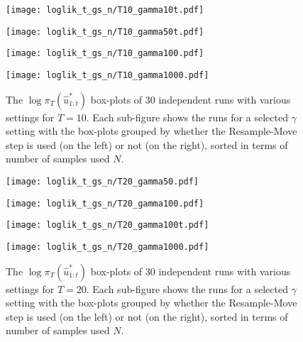 \begin{figure}[!thbp]
    \centering
    \begin{minipage}{0.5\textwidth}
        \centering
        \texttt{[image: loglik\_t\_gs\_n/T10\_gamma10t.pdf]}
    \end{minipage}%
    \begin{minipage}{0.5\textwidth}
        \centering
        \texttt{[image: loglik\_t\_gs\_n/T10\_gamma50t.pdf]}
    \end{minipage}
    \begin{minipage}{0.5\textwidth}
        \centering
        \texttt{[image: loglik\_t\_gs\_n/T10\_gamma100.pdf]}
    \end{minipage}%
    \begin{minipage}{0.5\textwidth}
        \centering
        \texttt{[image: loglik\_t\_gs\_n/T10\_gamma1000.pdf]}
    \end{minipage}
    \caption{The $\log\pi_T(\hat{u}^*_{1:t})$ box-plots of 30 independent runs with various settings for $T=10$. Each sub-figure shows the runs for a selected $\gamma$ setting with the box-plots grouped by whether the Resample-Move step is used (on the left) or not (on the right), sorted in terms of number of samples used $N$.}
    \label{fig:rm2}
\end{figure}

\begin{figure}[!thbp]
    \centering
    \begin{minipage}{0.5\textwidth}
        \centering
        \texttt{[image: loglik\_t\_gs\_n/T20\_gamma50.pdf]}
    \end{minipage}%
    \begin{minipage}{0.5\textwidth}
        \centering
        \texttt{[image: loglik\_t\_gs\_n/T20\_gamma100.pdf]}
    \end{minipage}
    \begin{minipage}{0.5\textwidth}
        \centering
        \texttt{[image: loglik\_t\_gs\_n/T20\_gamma100t.pdf]}
    \end{minipage}%
    \begin{minipage}{0.5\textwidth}
        \centering
        \texttt{[image: loglik\_t\_gs\_n/T20\_gamma1000.pdf]}
    \end{minipage}
    \caption{The $\log\pi_T(\hat{u}^*_{1:t})$ box-plots of 30 independent runs with various settings for $T=20$. Each sub-figure shows the runs for a selected $\gamma$ setting with the box-plots grouped by whether the Resample-Move step is used (on the left) or not (on the right), sorted in terms of number of samples used $N$.}
    \label{fig:rm3}
\end{figure}


